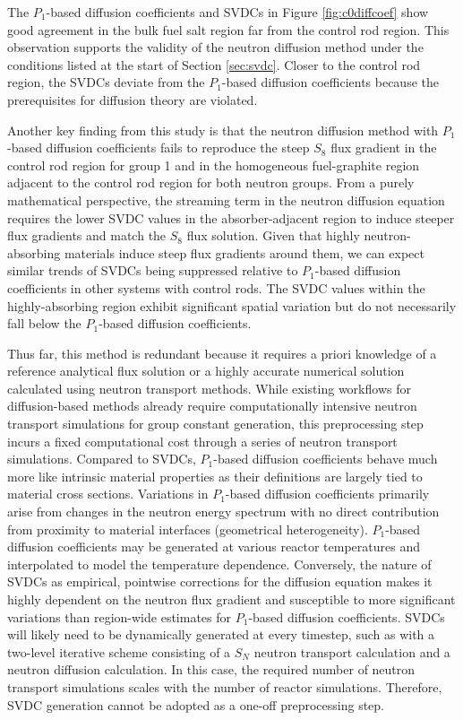 The $P_1$-based diffusion coefficients and \glspl{SVDC} in Figure \ref{fig:c0diffcoef} show good
agreement in the bulk fuel salt region far from the control rod region.
This observation supports the validity of the neutron diffusion method under the conditions
listed at the start of Section \ref{sec:svdc}. Closer to the control rod
region, the \glspl{SVDC} deviate from the $P_1$-based diffusion coefficients because the
prerequisites for diffusion theory are violated.

Another key finding from this study is that the neutron diffusion method with $P_1$-based
diffusion coefficients fails to reproduce the steep $S_8$ flux gradient in the control rod region
for group 1 and in the homogeneous fuel-graphite region adjacent to the control rod region for both
neutron groups. From a purely mathematical perspective, the streaming term in the neutron
diffusion equation requires the lower
\gls{SVDC} values in the absorber-adjacent region to induce steeper flux gradients and match the
$S_8$ flux solution. Given that highly neutron-absorbing materials induce steep flux gradients
around them, we can expect similar trends of \glspl{SVDC} being suppressed relative to
$P_1$-based diffusion coefficients in other systems with control rods. The \gls{SVDC} values within
the highly-absorbing region exhibit significant spatial variation but do not necessarily fall
below the $P_1$-based diffusion coefficients.

Thus far, this method is redundant because it requires a priori knowledge of a reference
analytical flux solution or a highly accurate numerical solution calculated using neutron
transport methods. While existing workflows for diffusion-based methods already require
computationally intensive neutron transport simulations for group constant generation, this
preprocessing step incurs a fixed computational cost through
a series of neutron transport simulations. Compared to \glspl{SVDC}, $P_1$-based diffusion
coefficients behave much more like intrinsic material properties as their definitions are largely
tied to material cross sections. Variations in $P_1$-based diffusion coefficients primarily arise
from changes in the neutron energy spectrum with no direct contribution from proximity to material
interfaces (geometrical heterogeneity). $P_1$-based diffusion coefficients may be generated at
various reactor temperatures and interpolated to model the temperature dependence. Conversely, the
nature of \glspl{SVDC} as empirical, pointwise corrections for the diffusion equation
makes it highly dependent on the neutron flux gradient and susceptible to more significant
variations than region-wide estimates for $P_1$-based diffusion coefficients. \glspl{SVDC} will
likely need to be dynamically generated at every timestep, such as with a two-level iterative
scheme consisting of a $S_N$ neutron transport calculation and a neutron
diffusion calculation. In this case, the required number of neutron transport simulations scales
with the number of reactor simulations. Therefore, \gls{SVDC} generation cannot be adopted as a
one-off preprocessing step. 

